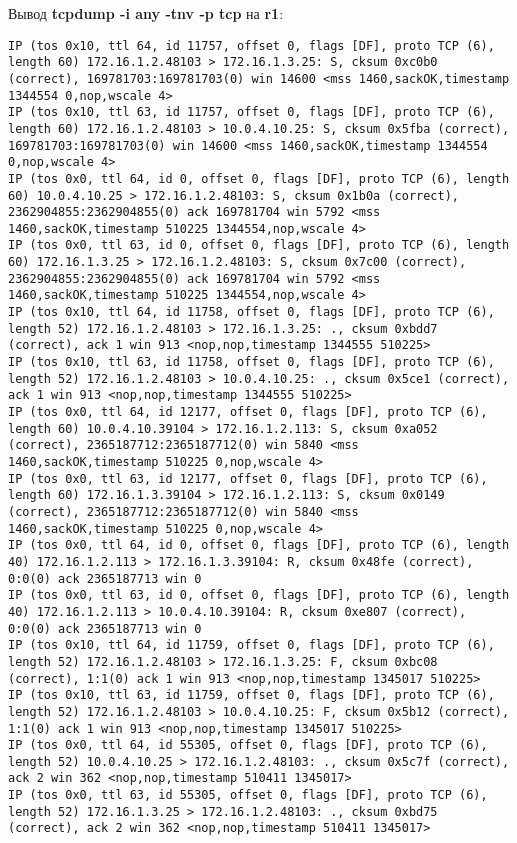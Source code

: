 \documentclass[a4paper,12pt]{article}
\begin{document}
Вывод \textbf{tcpdump -i any -tnv -p tcp} на \textbf{r1}:
\begin{Verbatim}
IP (tos 0x10, ttl 64, id 11757, offset 0, flags [DF], proto TCP (6), length 60) 172.16.1.2.48103 > 172.16.1.3.25: S, cksum 0xc0b0 (correct), 169781703:169781703(0) win 14600 <mss 1460,sackOK,timestamp 1344554 0,nop,wscale 4>
IP (tos 0x10, ttl 63, id 11757, offset 0, flags [DF], proto TCP (6), length 60) 172.16.1.2.48103 > 10.0.4.10.25: S, cksum 0x5fba (correct), 169781703:169781703(0) win 14600 <mss 1460,sackOK,timestamp 1344554 0,nop,wscale 4>
IP (tos 0x0, ttl 64, id 0, offset 0, flags [DF], proto TCP (6), length 60) 10.0.4.10.25 > 172.16.1.2.48103: S, cksum 0x1b0a (correct), 2362904855:2362904855(0) ack 169781704 win 5792 <mss 1460,sackOK,timestamp 510225 1344554,nop,wscale 4>
IP (tos 0x0, ttl 63, id 0, offset 0, flags [DF], proto TCP (6), length 60) 172.16.1.3.25 > 172.16.1.2.48103: S, cksum 0x7c00 (correct), 2362904855:2362904855(0) ack 169781704 win 5792 <mss 1460,sackOK,timestamp 510225 1344554,nop,wscale 4>
IP (tos 0x10, ttl 64, id 11758, offset 0, flags [DF], proto TCP (6), length 52) 172.16.1.2.48103 > 172.16.1.3.25: ., cksum 0xbdd7 (correct), ack 1 win 913 <nop,nop,timestamp 1344555 510225>
IP (tos 0x10, ttl 63, id 11758, offset 0, flags [DF], proto TCP (6), length 52) 172.16.1.2.48103 > 10.0.4.10.25: ., cksum 0x5ce1 (correct), ack 1 win 913 <nop,nop,timestamp 1344555 510225>
IP (tos 0x0, ttl 64, id 12177, offset 0, flags [DF], proto TCP (6), length 60) 10.0.4.10.39104 > 172.16.1.2.113: S, cksum 0xa052 (correct), 2365187712:2365187712(0) win 5840 <mss 1460,sackOK,timestamp 510225 0,nop,wscale 4>
IP (tos 0x0, ttl 63, id 12177, offset 0, flags [DF], proto TCP (6), length 60) 172.16.1.3.39104 > 172.16.1.2.113: S, cksum 0x0149 (correct), 2365187712:2365187712(0) win 5840 <mss 1460,sackOK,timestamp 510225 0,nop,wscale 4>
IP (tos 0x0, ttl 64, id 0, offset 0, flags [DF], proto TCP (6), length 40) 172.16.1.2.113 > 172.16.1.3.39104: R, cksum 0x48fe (correct), 0:0(0) ack 2365187713 win 0
IP (tos 0x0, ttl 63, id 0, offset 0, flags [DF], proto TCP (6), length 40) 172.16.1.2.113 > 10.0.4.10.39104: R, cksum 0xe807 (correct), 0:0(0) ack 2365187713 win 0
IP (tos 0x10, ttl 64, id 11759, offset 0, flags [DF], proto TCP (6), length 52) 172.16.1.2.48103 > 172.16.1.3.25: F, cksum 0xbc08 (correct), 1:1(0) ack 1 win 913 <nop,nop,timestamp 1345017 510225>
IP (tos 0x10, ttl 63, id 11759, offset 0, flags [DF], proto TCP (6), length 52) 172.16.1.2.48103 > 10.0.4.10.25: F, cksum 0x5b12 (correct), 1:1(0) ack 1 win 913 <nop,nop,timestamp 1345017 510225>
IP (tos 0x0, ttl 64, id 55305, offset 0, flags [DF], proto TCP (6), length 52) 10.0.4.10.25 > 172.16.1.2.48103: ., cksum 0x5c7f (correct), ack 2 win 362 <nop,nop,timestamp 510411 1345017>
IP (tos 0x0, ttl 63, id 55305, offset 0, flags [DF], proto TCP (6), length 52) 172.16.1.3.25 > 172.16.1.2.48103: ., cksum 0xbd75 (correct), ack 2 win 362 <nop,nop,timestamp 510411 1345017>
\end{Verbatim}
\end{document}
